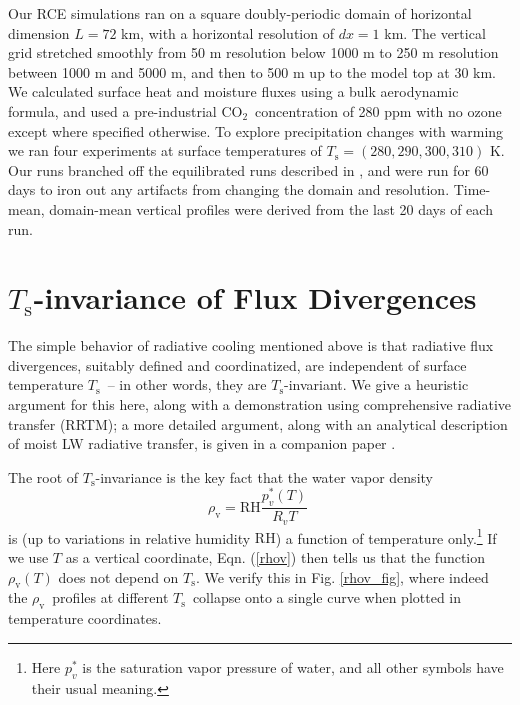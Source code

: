\documentclass[10pt]{article}
\newcommand{\beqn}{\begin{equation}}
\newcommand{\eeqn}{\end{equation}}
\newcommand{\eqnref}[1]{(\ref{#1})}
\newcommand{\cotwo}{\ensuremath{\mathrm{CO_2}}}
\newcommand{\rhov}{\ensuremath{\rho_\mathrm{v}}}
\newcommand{\Ts}{\ensuremath{T_\mathrm{s}}}
\newcommand{\RH}{\ensuremath{\mathrm{RH}}}
\begin{document}
	Our RCE simulations ran on a square doubly-periodic domain of horizontal dimension $L=72$ km, with  a horizontal resolution of $dx=1$ km. The vertical grid stretched smoothly from 50 m resolution below 1000 m to 250 m resolution between 1000 m and 5000 m, and then to 500 m up to the model top at  30 km. We calculated surface heat and moisture fluxes using a bulk aerodynamic formula, and used a pre-industrial \cotwo\  concentration of 280 ppm with no ozone except where specified otherwise. To explore precipitation changes  with warming we ran four experiments at surface temperatures of $\Ts=(280,290,300,310)$ K. Our runs branched off the equilibrated runs described in \cite{romps2014}, and were run for 60 days  to iron out any artifacts from changing the domain and resolution. Time-mean,  domain-mean vertical profiles were derived from the last 20 days  of each run. 

\section{\Ts-invariance of Flux Divergences}
The simple behavior of radiative cooling mentioned above is that radiative flux divergences, suitably defined and  coordinatized, are independent of surface temperature \Ts\ -- in other words, they are \Ts-invariant. We give a heuristic argument for this here, along with a demonstration using comprehensive radiative transfer (RRTM); a more detailed argument, along with an analytical description of moist LW radiative transfer, is given in a companion paper \cite{jeevanjee2016b}.

The root of \Ts-invariance is the key fact that  the water vapor density 
	\beqn
		\rhov =  \RH\frac{p_v^*(T)}{R_ vT} \; 
	\label{rhov}
	\eeqn
	 is (up to variations in relative humidity \RH) a function of temperature only.\footnote{Here $p_v^*$  is the saturation vapor pressure of water, and all other symbols have their usual meaning.} If we use $T$ as a vertical coordinate,  Eqn. \eqnref{rhov} then tells us that the function $\rhov(T)$ does not depend on \Ts.  We verify this  in Fig. \ref{rhov_fig}, where indeed  the \rhov\ profiles at different \Ts\ collapse onto a single curve when plotted in temperature coordinates.
	 
\end{document}
